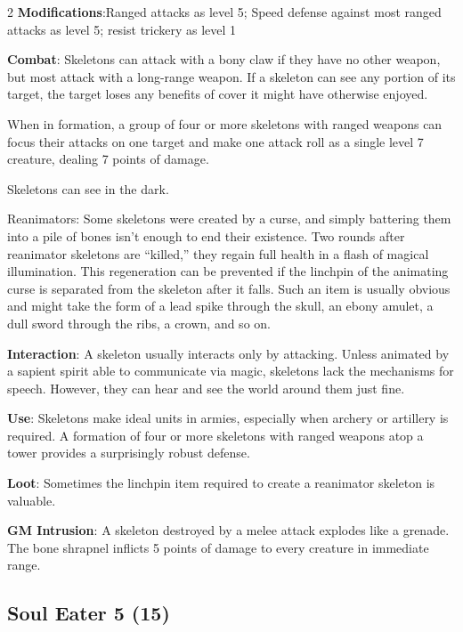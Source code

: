 \begin{multicols}{2}
\textbf{Modifications}:Ranged attacks as level 5; Speed defense against most ranged attacks as level 5; resist trickery as level 1

\textbf{Combat}: Skeletons can attack with a bony claw if they have no other weapon, but most attack with a long-range weapon. If a skeleton can see any portion of its target, the target loses any benefits of cover it might have otherwise enjoyed.

When in formation, a group of four or more skeletons with ranged weapons can focus their attacks on one target and make one attack roll as a single level 7 creature, dealing 7 points of damage.

Skeletons can see in the dark.

Reanimators: Some skeletons were created by a curse, and simply battering them into a pile of bones isn’t enough to end their existence. Two rounds after reanimator skeletons are “killed,” they regain full health in a flash of magical illumination. This regeneration can be prevented if the linchpin of the animating curse is separated from the skeleton after it falls. Such an item is usually obvious and might take the form of a lead spike through the skull, an ebony amulet, a dull sword through the ribs, a crown, and so on.

\textbf{Interaction}: A skeleton usually interacts only by attacking. Unless animated by a sapient spirit able to communicate via magic, skeletons lack the mechanisms for speech. However, they can hear and see the world around them just fine.

\textbf{Use}: Skeletons make ideal units in armies, especially when archery or artillery is required. A formation of four or more skeletons with ranged weapons atop a tower provides a surprisingly robust defense.

\textbf{Loot}: Sometimes the linchpin item required to create a reanimator skeleton is valuable.

\textbf{GM Intrusion}: A skeleton destroyed by a melee attack explodes like a grenade. The bone shrapnel inflicts 5 points of damage to every creature in immediate range.

\subsection{Soul Eater 5 (15)}


\end{multicols}
